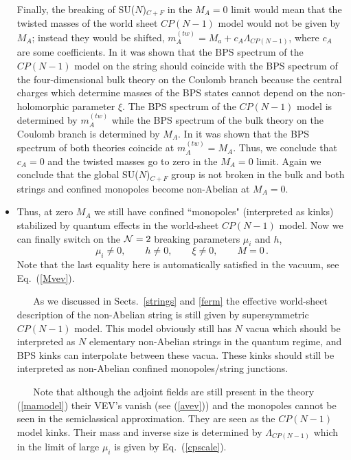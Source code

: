 \documentclass[epsfig,12pt]{article}
\def\beq{\begin{equation}}
\def\eeq{\end{equation}}
\newcommand{\ntwo}{${\cal N}=2\;$}
\begin{document}
\begin{itemize}
Finally, the breaking of SU($N$)$_{C+F}$
in the $M_A=0$ limit would mean that the twisted masses of the world sheet $CP(N-1)$
 model 
would  not be given by $M_A$; instead they would be shifted, 
$m^{(tw)}_A=M_a +c_A \Lambda_{CP(N-1)}$,
where $c_A$ are  some coefficients. 
In \cite{SYmon,HT2} it was 
shown that the BPS spectrum of the $CP(N-1)$ model on the string should coincide with
the BPS spectrum of the four-dimensional bulk theory on the Coulomb branch because 
the central charges which determine masses of the BPS states cannot depend on the 
non-holomorphic
parameter $\xi$. The BPS spectrum of the $CP(N-1)$ model is determined by $m^{(tw)}_A$
while the BPS spectrum of the bulk theory on the Coulomb branch is determined by
$M_A$. In \cite{Dorey} it was shown that the BPS spectrum of both theories coincide
at $m^{(tw)}_A=M_A$. Thus, we conclude that $c_A=0$ and the twisted masses go to zero in
the $M_A=0$ limit. Again we conclude that the global SU($N$)$_{C+F}$ group is not 
broken in the bulk and both
strings and confined monopoles become non-Abelian at $M_A=0$.




\item

Thus, at zero $M_A$ we still have confined ``monopoles" (interpreted
as  kinks) stabilized
by quantum effects in the world-sheet $CP(N-1)$ model. Now we can 
finally switch on the \ntwo breaking parameters $\mu_i$
and $h$,
\beq
\mu_i\neq 0,\qquad h\neq 0, \qquad \xi\neq 0, \qquad M = 0\, .
\label{stage4}
\eeq
Note that the last equality here is automatically satisfied in the vacuum, see
Eq.~(\ref{Mvev}).

\mbox{} \,\,\,\,\,\,\,\,
As we discussed in Sects.~\ref{strings} and \ref{ferm}
the effective world-sheet description of the non-Abelian string is
still given by supersymmetric  $CP(N-1)$ model. This model obviously
still has $N$ vacua
which should be interpreted as $N$ elementary non-Abelian
strings in the quantum regime, and  BPS kinks
can interpolate between these vacua. These kinks
should still be interpreted as non-Abelian
confined monopoles/string junctions. 

\mbox{} \,\,\,\,\,\,\,\,
Note that although the adjoint fields are still
present in the theory (\ref{mamodel}) their VEV's vanish (see (\ref{avev}))
and the monopoles cannot be seen in the semiclassical approximation. 
They are seen as  the $CP(N-1)$ model kinks.
Their  mass and inverse size is determined by $\Lambda_{CP(N-1)}$ which
in the limit of large $\mu_i$ is given by Eq.~(\ref{cpscale}). 


\end{itemize}
\end{document}
